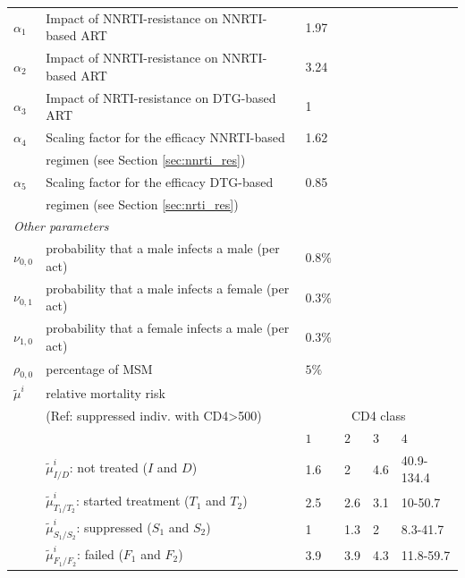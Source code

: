 \documentclass{article}
\begin{document}
\begin{table}[H]
{\begin{tabular}{llllll}
		$\alpha_1$ & Impact of NNRTI-resistance on NNRTI-based ART & 1.97 & \cite{Wittkop2011,Kuritzkes2008}\\
		$\alpha_2$ & Impact of NNRTI-resistance on NNRTI-based ART & 3.24 & \cite{Wittkop2011,Kuritzkes2008}\\
		$\alpha_3$ & Impact of NRTI-resistance on DTG-based ART & 1 & \cite{Hakim2018,Giacomelli2019,F1000Research}\\
		$\alpha_4$ & Scaling factor for the efficacy NNRTI-based & 1.62 & \cite{Egger2012}\\
		& regimen (see Section \ref{sec:nnrti_res})\\
		$\alpha_5$ & Scaling factor for the efficacy DTG-based &  0.85 & \cite{Group2019}\\
		& regimen (see Section \ref{sec:nrti_res})\\[8pt]
		\multicolumn{2}{l}{\textit{Other parameters}}\\
		$\nu_{0,0}$ & probability that a male infects a male (per act) & $0.8\%$ &\cite{transm}\\
		$\nu_{0,1}$ & probability that a male infects a female (per act) & $0.3\%$ &\cite{transm}\\
		$\nu_{1,0}$ & probability that a female infects a male (per act) & $0.3\%$ &\cite{transm}\\
		$\rho_{0,0}$ & percentage of MSM & $5\%$ & \cite{p_msm}\\
		$\tilde{\mu}^i$ & relative mortality risk & & \cite{mort1} \cite{mort2}\\
		& (Ref: suppressed indiv. with CD4>500) & \multicolumn{4}{c}{CD4 class}\\
		&  & $1$ & $2$ & $3$ & $4$\\
		\cmidrule(lll){3-6}
		& $\tilde{\mu}_{I/D}^i$: not treated ($I$ and $D$) & 1.6 & 2 & 4.6 & 40.9-134.4\\
		& $\tilde{\mu}_{T_1/T_2}^i$: started treatment ($T_1$ and $T_2$) & 2.5 & 2.6 & 3.1 & 10-50.7\\
		& $\tilde{\mu}_{S_1/S_2}^i$: suppressed ($S_1$ and $S_2$) & 1 & 1.3 & 2 & 8.3-41.7\\
		& $\tilde{\mu}_{F_1/F_2}^i$: failed ($F_1$ and $F_2$) & 3.9 & 3.9 & 4.3 & 11.8-59.7\\
		\hline
	\end{tabular}	
}
\end{table}
\end{document}
